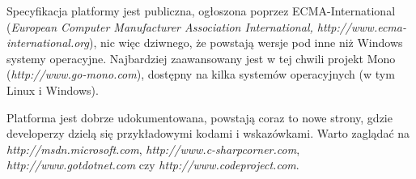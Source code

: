 Specyfikacja platformy \NET{} jest publiczna, ogłoszona poprzez ECMA-International ({\em European Computer
Manufacturer Association International, http://www.ecma-international.org}), nic więc dziwnego, że 
powstają wersje pod inne niż Windows systemy operacyjne. Najbardziej zaawansowany jest w tej chwili
projekt Mono ({\em http://www.go-mono.com}), dostępny na kilka systemów operacyjnych (w tym Linux i Windows).

Platforma \NET{} jest dobrze udokumentowana, powstają coraz to nowe strony, gdzie developerzy
dzielą się przykładowymi kodami i wskazówkami. Warto zaglądać na {\em http://msdn.microsoft.com},
{\em http://www.c-sharpcorner.com}, {\em http://www.gotdotnet.com} czy {\em http://www.codeproject.com}.